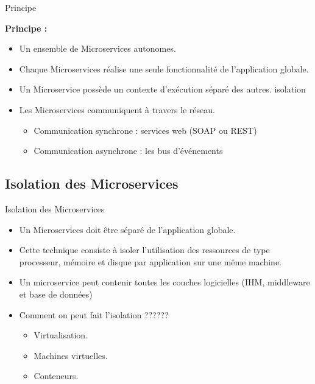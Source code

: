 \documentclass{beamer}
\begin{document}
    \begin{frame}{Principe} 

        \alert{\textbf{Principe :}}
        \begin{itemize}
            \item Un ensemble de Microservices autonomes.
            \item Chaque Microservices réalise une seule fonctionnalité de
                l'application globale.
            \item Un Microservice possède un contexte d’exécution séparé
                des autres. \alert{isolation}
            \item Les Microservices communiquent à travers le réseau. 
                \begin{itemize}
                    \item Communication synchrone : services web (\alert{SOAP} ou \alert{REST})
                    \item Communication asynchrone : les bus d’événements 
                \end{itemize}
        \end{itemize} 

\end{frame}

\subsection{Isolation des Microservices}

\begin{frame}{Isolation des Microservices}
    \begin{itemize}
        \item Un Microservices doit être séparé de l'application globale. 
        \item Cette technique consiste à isoler l’utilisation des ressources de type processeur, mémoire et disque par application sur une même machine.
        \item Un microservice peut contenir toutes les couches logicielles (IHM, middleware et base de données)
        \item Comment on peut fait \alert{l'isolation} ??????
            \begin{itemize}
                \item Virtualisation.
                \item \alert{Machines virtuelles}.
                \item \alert{Conteneurs}.
            \end{itemize}
    \end{itemize}
\end{frame}
\end{document}
